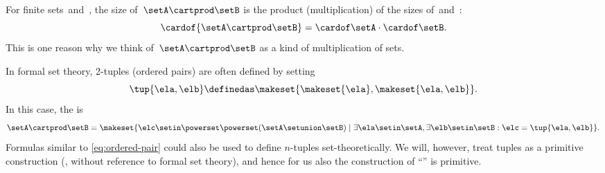 %

\begin{remark}
    For finite sets~\setA and~\setB, the size of~$\setA \cartprod \setB$ is the product (multiplication) of the sizes of~\setA and~\setB:
    \begin{equation}
        \cardof{\setA \cartprod \setB}  = \cardof\setA  \cdot \cardof \setB.
    \end{equation}
    This is one reason why we think of~$\setA \cartprod \setB$ as a kind of multiplication of sets.
\end{remark}

\begin{remark}
    In formal set theory, 2-tuples (ordered pairs) are often defined by setting
    \begin{equation}
        \label{eq:ordered-pair}
        \tup{\ela, \elb} \definedas \makeset{ \makeset{\ela }, \makeset{ \ela, \elb } }.
    \end{equation}
    In this case, the  is
    \begin{equation}
        \setA \cartprod \setB = \makeset{ \elc \setin\powerset \powerset (\setA \setunion \setB) \mid \exists \ela \setin\setA, \exists \elb \setin\setB : \elc = \tup{\ela, \elb} }.
    \end{equation}
    Formulas similar to \cref{eq:ordered-pair} could also be used to define $n$-tuples set-theoretically.
    We will, however, treat tuples as a primitive construction (\ie, without reference to formal set theory), and hence for us also the construction of ``'' is primitive.
\end{remark}

